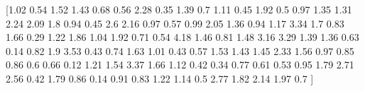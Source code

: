 \documentclass[preview]{standalone}
\begin{document}
\begin{center}
[1.02 0.54 1.52 1.43 0.68 0.56 2.28 0.35 1.39 0.7  1.11 0.45 1.92 0.5
 0.97 1.35 1.31 2.24 2.09 1.8  0.94 0.45 2.6  2.16 0.97 0.57 0.99 2.05
 1.36 0.94 1.17 3.34 1.7  0.83 1.66 0.29 1.22 1.86 1.04 1.92 0.71 0.54
 4.18 1.46 0.81 1.48 3.16 3.29 1.39 1.36 0.63 0.14 0.82 1.9  3.53 0.43
 0.74 1.63 1.01 0.43 0.57 1.53 1.43 1.45 2.33 1.56 0.97 0.85 0.86 0.6
 0.66 0.12 1.21 1.54 3.37 1.66 1.12 0.42 0.34 0.77 0.61 0.53 0.95 1.79
 2.71 2.56 0.42 1.79 0.86 0.14 0.91 0.83 1.22 1.14 0.5  2.77 1.82 2.14
 1.97 0.7 ]
\end{center}
\end{document}
